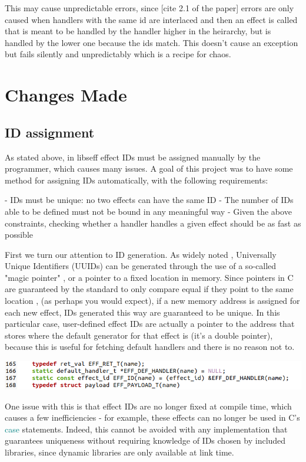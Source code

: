 \documentclass[logo,bsc,singlespacing,parskip,online]{infthesis}
\begin{document}
This may cause unpredictable errors, since [cite 2.1 of the paper] errors are only caused when handlers with the same id are interlaced and then an effect is called that is meant to be handled by the handler higher in the heirarchy, but is handled by the lower one because the ids match. This doesn't cause an exception but fails silently and unpredictably which is a recipe for chaos. %

\chapter{Changes Made}

\section{ID assignment}

As stated above, in libseff effect IDs must be assigned manually by the programmer, which causes many issues. A goal of this project was to have some method for assigning IDs automatically, with the following requirements:

 - IDs must be unique: no two effects can have the same ID
 - The number of IDs able to be defined must not be bound in any meaningful way
 - Given the above constraints, checking whether a handler handles a given effect should be as fast as possible

First we turn our attention to ID generation. As widely noted%
, Universally Unique Identifiers (UUIDs) can be generated through the use of a so-called "magic pointer"%
, or a pointer to a fixed location in memory. Since pointers in C are guaranteed by the standard to only compare equal if they point to the same location%
, (as perhaps you would expect), if a new memory address is assigned for each new effect, IDs generated this way are guaranteed to be unique. In this particular case, user-defined effect IDs are actually a pointer to the address that stores where the default generator for that effect is (it's a double pointer), because this is useful for fetching default handlers and there is no reason not to.

\includegraphics[scale=0.7]{ID_def_code.png}

One issue with this is that effect IDs are no longer fixed at compile time, which causes a few inefficiencies - for example, these effects can no longer be used in C's \textcolor{teal}{case} statements. Indeed, this cannot be avoided with any implementation that guarantees uniqueness without requiring knowledge of IDs chosen by included libraries, since dynamic libraries are only available at link time.
\end{document}
